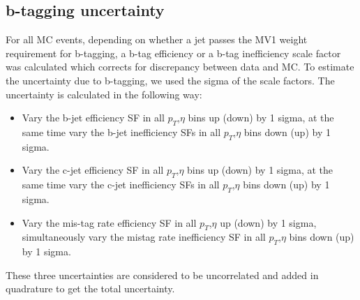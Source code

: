 \subsection{b-tagging uncertainty}
For all MC events, depending on whether a jet passes the MV1 weight requirement for b-tagging, a b-tag efficiency or a b-tag inefficiency scale factor was calculated which corrects for discrepancy between data and MC. To estimate the uncertainty due to b-tagging, we used the sigma of the scale factors. The uncertainty is calculated in the following way:
\begin{itemize}
\item Vary the b-jet efficiency SF in all $p_{T}$,$\eta$ bins up (down) by 1 sigma, at the same time vary the b-jet inefficiency SFs in all $p_{T}$,$\eta$ bins down (up) by 1 sigma. 
\item Vary the c-jet efficiency SF in all $p_{T}$,$\eta$ bins up (down) by 1 sigma, at the same time vary the c-jet inefficiency SFs in all $p_{T}$,$\eta$ bins down (up) by 1 sigma. 
\item Vary the mis-tag rate efficiency SF in all $p_{T}$,$\eta$ up (down) by 1 sigma, simultaneously vary the mistag rate inefficiency SF in all $p_{T}$,$\eta$ bins down (up) by 1 sigma. 
\end{itemize}
These three uncertainties are considered to be uncorrelated and added in quadrature to get the total uncertainty.
 
